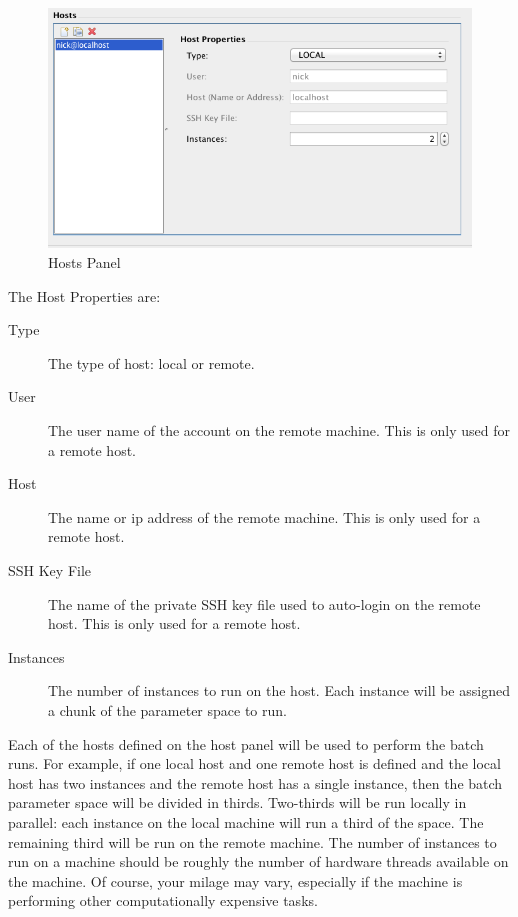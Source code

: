 \documentclass[11pt]{amsart}
\begin{document}
\begin{figure}[h]
\begin{center}
\vspace{.2in}
\centerline {
\includegraphics[width=6in]{images/hosts_panel.png}
}
\caption{Hosts Panel}
\label{fig:hosts_panel}
\end{center}
\end{figure}

The Host Properties are:

\begin{description}
\item[Type] The type of host: local or remote.
\item[User] The user name of the account on the remote machine. This is only used for a remote host.
\item[Host] The name or ip address of the remote machine. This is only used for a remote host.
\item[SSH Key File] The name of the private SSH key file used to auto-login on the remote host. This is only used for a remote host.
\item[Instances] The number of instances to run on the host. Each instance will be assigned a chunk of the parameter space to run.
\end{description}

Each of the hosts defined on the host panel will be used to perform the batch runs. For example, if one local host and one remote host is defined and the local host has two instances and the remote host has a single instance, then the batch parameter space will be divided in thirds. Two-thirds will be run locally in parallel: each instance on the local machine will run a third of the space. The remaining third will be run on the remote machine. The number of instances to run on a machine should be roughly the number of hardware threads available on the machine. Of course, your milage may vary, especially if the machine is performing other computationally expensive tasks.
\end{document}
